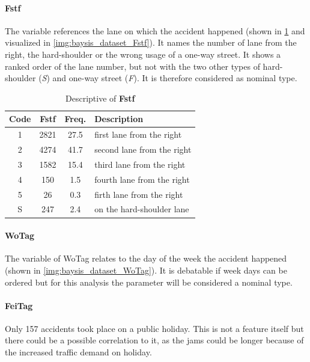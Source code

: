 \paragraph{Fstf}
\label{baysis_dataset_Fstf}
The variable references the lane on which the accident happened (shown in \cref{tbl:baysis_dataset_Fstf} and visualized in \cref{img:baysis_dataset_Fstf}). It names the number of lane from the right, the hard-shoulder or the wrong usage of a one-way street. It shows a ranked order of the lane number, but not with the two other types of hard-shoulder (\textit{S}) and one-way street (\textit{F}). It is therefore considered as nominal type.
\begin{table}[ht]
	\centering
	\small
	\begin{tabular}{c|c|c|l}
		\toprule
		Code & \textbf{Fstf} & Freq. & Description \\ 
		\midrule  
		1 & 2821 	& 27.5 	& first lane from the right \\
		2 & 4274 	& 41.7 	& second lane from the right \\
		3 & 1582 	& 15.4 	& third lane from the right \\
		4 & 150 	& 1.5 	& fourth lane from the right \\
		5 & 26 		& 0.3 	& firth lane from the right \\ 
 		S & 247 	& 2.4 	& on the hard-shoulder lane \\ 
		\bottomrule
	\end{tabular}
	\caption{Descriptive of \textbf{Fstf}}
	\label{tbl:baysis_dataset_Fstf}
	\vspace{-8mm}
\end{table} 
\paragraph{WoTag}
\label{baysis_dataset_WoTag}
The variable of WoTag relates to the day of the week the accident happened (shown in \cref{img:baysis_dataset_WoTag}). It is debatable if week days can be ordered but for this analysis the parameter will be considered a nominal type.
\paragraph{FeiTag}
\label{baysis_dataset_FeiTag}
Only 157 accidents took place on a public holiday. This is not a feature itself but there could be a possible correlation to it, as the jams could be longer because of the increased traffic demand on holiday.
	
